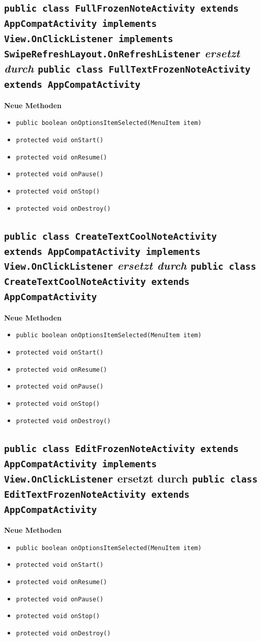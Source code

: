 \documentclass[a4paper]{scrreprt}
\begin{document}
		\subsection{\texttt{public class FullFrozenNoteActivity extends AppCompatActivity implements View.OnClickListener implements SwipeRefreshLayout.OnRefreshListener} \textit{ersetzt durch} \texttt{public class FullTextFrozenNoteActivity extends AppCompatActivity}}
			\textbf{Neue Methoden}
			\begin{itemize}
				\item \texttt{public boolean onOptionsItemSelected(MenuItem item)}
				\item \texttt{protected void onStart()}
				\item \texttt{protected void onResume()}
				\item \texttt{protected void onPause()}
				\item \texttt{protected void onStop()}
				\item \texttt{protected void onDestroy()}
			\end{itemize}
		\subsection{\texttt{public class CreateTextCoolNoteActivity extends AppCompatActivity implements View.OnClickListener} \textit{ersetzt durch} \texttt{public class CreateTextCoolNoteActivity extends AppCompatActivity}}
			\textbf{Neue Methoden}
			\begin{itemize}
				\item \texttt{public boolean onOptionsItemSelected(MenuItem item)}
				\item \texttt{protected void onStart()}
				\item \texttt{protected void onResume()}
				\item \texttt{protected void onPause()}
				\item \texttt{protected void onStop()}
				\item \texttt{protected void onDestroy()}
			\end{itemize}
		\subsection{\texttt{public class EditFrozenNoteActivity extends AppCompatActivity implements View.OnClickListener} ersetzt durch \texttt{public class EditTextFrozenNoteActivity extends AppCompatActivity}}
		\textbf{Neue Methoden}
		\begin{itemize}
			\item \texttt{public boolean onOptionsItemSelected(MenuItem item)}
			\item \texttt{protected void onStart()}
			\item \texttt{protected void onResume()}
			\item \texttt{protected void onPause()}
			\item \texttt{protected void onStop()}
			\item \texttt{protected void onDestroy()}
		\end{itemize}
		
\end{document}
